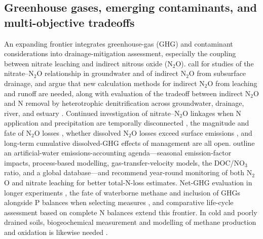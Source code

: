 \documentclass[11pt]{article}
\begin{document}
\subsection{Greenhouse gases, emerging contaminants, and multi-objective tradeoffs}

An expanding frontier integrates greenhouse-gas (GHG) and contaminant considerations into drainage-mitigation assessment, especially the coupling between nitrate leaching and indirect nitrous oxide (N$_2$O). \textcite{Sawamoto2003} call for studies of the nitrate--N$_2$O relationship in groundwater and of indirect N$_2$O from subsurface drainage, and \textcite{Minamikawa2015} argue that new calculation methods for indirect N$_2$O from leaching and runoff are needed, along with evaluation of the tradeoff between indirect N$_2$O and N removal by heterotrophic denitrification across groundwater, drainage, river, and estuary \parencite{Minamikawa2013,Minamikawa2010}. Continued investigation of nitrate--N$_2$O linkages when N application and precipitation are temporally disconnected \parencite{OBrien2022}, the magnitude and fate of N$_2$O losses \parencite{Burton2024}, whether dissolved N$_2$O losses exceed surface emissions \parencite{Smith2019}, and long-term cumulative dissolved-GHG effects of management \parencite{Oliveira2025} are all open. \textcite{Webb2021} outline an artificial-water emissions-accounting agenda---seasonal emission-factor impacts, process-based modelling, gas-transfer-velocity models, the DOC/NO$_3$ ratio, and a global database---and \textcite{Fontes2019} recommend year-round monitoring of both N$_2$O and nitrate leaching for better total-N-loss estimates. Net-GHG evaluation in longer experiments \parencite{PrezaFontes2023}, the fate of waterborne methane and inclusion of GHGs alongside P balances when selecting measures \parencite{Carstensen2021}, and comparative life-cycle assessment based on complete N balances \parencite{HernandezRamirez2011} extend this frontier. In cold and poorly drained soils, biogeochemical measurement and modelling of methane production and oxidation is likewise needed \parencite{Kumar2014b}.
\end{document}
